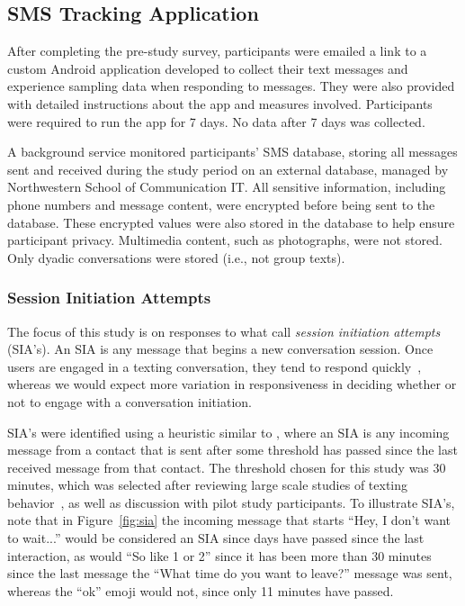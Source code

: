 \documentclass[12pt]{nuthesis}	%
\begin{document}
\subsection{SMS Tracking Application}

After completing the pre-study survey, participants were emailed a link to a custom Android application developed to collect their text messages and experience sampling data when responding to messages. They were also provided with detailed instructions about the app and measures involved. Participants were required to run the app for 7 days. No data after 7 days was collected.

A background service monitored participants' SMS database, storing all messages sent and received during the study period on an external database, managed by Northwestern School of Communication IT. All sensitive information, including phone numbers and message content, were encrypted before being sent to the database. These encrypted values were also stored in the database to help ensure participant privacy. Multimedia content, such as photographs, were not stored. Only dyadic conversations were stored (i.e., not group texts).

\subsubsection{Session Initiation Attempts}

The focus of this study is on responses to what \citet{avrahami2006responsiveness} call \textit{session initiation attempts} (SIA's). An SIA is any message that begins a new conversation session. Once users are engaged in a texting conversation, they tend to respond quickly~\citep{battestini2010large}, whereas we would expect more variation in responsiveness in deciding whether or not to engage with a conversation initiation.

SIA's were identified using a heuristic similar to \citet{avrahami2006responsiveness}, where an SIA is any incoming message from a contact that is sent after some threshold has passed since the last received message from that contact. The threshold chosen for this study was 30 minutes, which was selected after reviewing large scale studies of texting behavior~\citep{battestini2010large,birnholtz2017attending}, as well as discussion with pilot study participants. To illustrate SIA's, note that in Figure~\ref{fig:sia} the incoming message that starts ``Hey, I don't want to wait...'' would be considered an SIA since days have passed since the last interaction, as would ``So like 1 or 2'' since it has been more than 30 minutes since the last message the ``What time do you want to leave?'' message was sent, whereas the ``ok'' emoji would not, since only 11 minutes have passed.
\end{document}
